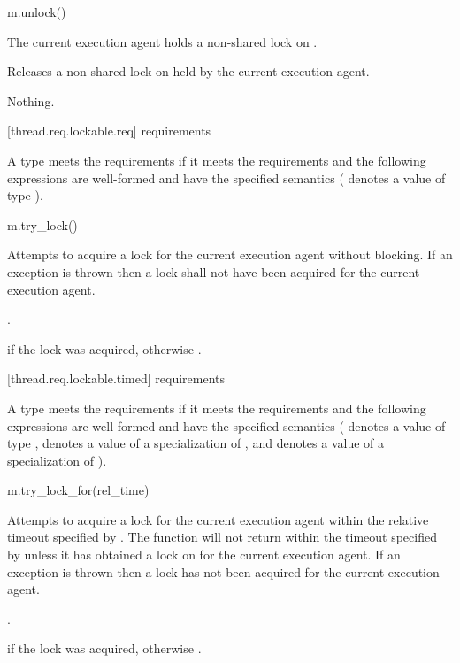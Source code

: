 \begin{itemdecl}
m.unlock()
\end{itemdecl}

\begin{itemdescr}
\pnum
\expects
The current execution agent holds a non-shared lock on .

\pnum
\effects
Releases a non-shared lock on  held by the current execution agent.

\pnum
\throws
Nothing.
\end{itemdescr}

[thread.req.lockable.req]{ requirements}

\pnum
A type  meets the  requirements if it meets the 
requirements and the following expressions are well-formed and have the specified semantics
( denotes a value of type ).

\begin{itemdecl}
m.try_lock()
\end{itemdecl}

\begin{itemdescr}
\pnum
\effects
Attempts to acquire a lock for the current execution agent without blocking. If an
exception is thrown then a lock shall not have been acquired for the current execution agent.

\pnum
\returntype {}.

\pnum
\returns
{} if the lock was acquired, otherwise .
\end{itemdescr}

[thread.req.lockable.timed]{ requirements}

\pnum
A type  meets the  requirements if it meets the 
requirements and the following expressions are well-formed and have the specified semantics
( denotes a value of type ,  denotes a value of a
specialization of , and  denotes a value
of a specialization of ).

\begin{itemdecl}
m.try_lock_for(rel_time)
\end{itemdecl}

\begin{itemdescr}
\pnum
\effects
Attempts to acquire a lock for the current execution agent within the relative
timeout specified by . The function will not return
within the timeout specified by  unless it has obtained a lock on 
for the current execution agent. If an exception is thrown then a lock has not been
acquired for the current execution agent.

\pnum
\returntype {}.

\pnum
\returns
{} if the lock was acquired, otherwise .
\end{itemdescr}

